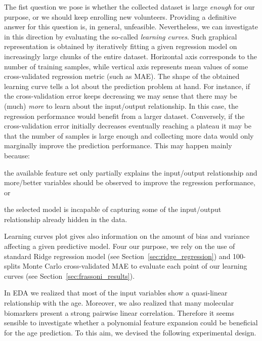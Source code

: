 The fist question we pose is whether the collected dataset is large \textit{enough} for our purpose, or we should keep enrolling new volunteers. Providing a definitive answer for this question is, in general, unfeasible. Nevertheless, we can investigate in this direction by evaluating the so-called \textit{learning curves}. Such graphical representation is obtained by iteratively fitting a given regression model on increasingly large chunks of the entire dataset.
Horizontal axis corresponds to the number of training samples, while vertical axis represents mean values of some cross-validated regression metric (such as MAE).
The shape of the obtained learning curve tells a lot about the prediction problem at hand. For instance, if the cross-validation error keeps decreasing we may sense that there may be (much) \textit{more} to learn about the input/output relationship. In this case, the regression performance would benefit from a larger dataset. Conversely, if the cross-validation error initially decreases eventually reaching a plateau it may be that the number of samples is large enough and collecting more data would only marginally improve the prediction performance. This may happen mainly because:
\begin{enumerate*}[label=(\roman*)]
	\item the available feature set only partially explains the input/output relationship and more/better variables should be observed to improve the regression performance, or
	\item the selected model is incapable of capturing some of the input/output relationship already hidden in the data.
\end{enumerate*}
Learning curves plot gives also information on the amount of bias and variance affecting a given predictive model.
Four our purpose, we rely on the use of standard Ridge regression model (see Section~\ref{sec:ridge_regression}) and 100-splits Monte Carlo cross-validated MAE to evaluate each point of our learning curves (see Section~\ref{sec:frassoni_results}).

In EDA we realized that most of the input variables show a quasi-linear relationship with the age. Moreover, we also realized that many molecular biomarkers present a strong pairwise linear correlation. Therefore it seems sensible to investigate whether a polynomial feature expansion could be beneficial for the age prediction.
To this aim, we devised the following experimental design.

